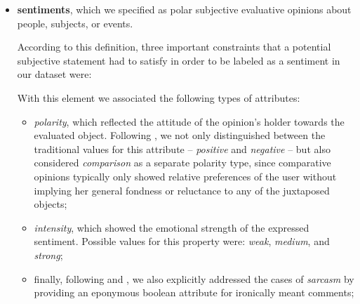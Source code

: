 \begin{itemize}
\item
  \textbf{sentiments}, which we specified as polar subjective
  evaluative opinions about people, subjects, or events.

  According to this definition, three important constraints that a
  potential subjective statement had to satisfy in order to be labeled
  as a sentiment in our dataset were:

  With this element we associated the following types of attributes:
  \begin{itemize}
    \item
      \emph{polarity}, which reflected the attitude of the opinion's
      holder towards the evaluated object.  Following
      \citet{Jindal:06a,Jindal:06b}, we not only distinguished between
      the traditional values for this attribute -- \emph{positive} and
      \emph{negative} -- but also considered \emph{comparison} as a
      separate polarity type, since comparative opinions typically
      only showed relative preferences of the user without implying
      her general fondness or reluctance to any of the juxtaposed
      objects;
    \item
      \emph{intensity}, which showed the emotional strength of the
      expressed sentiment.  Possible values for this property were:
      \emph{weak}, \emph{medium}, and \emph{strong};
    \item
      finally, following \citet{Bosco:13} and \citet{Rosenthal:14}, we
      also explicitly addressed the cases of \emph{sarcasm} by
      providing an eponymous boolean attribute for ironically meant
      comments;
  \end{itemize}


\end{itemize}
